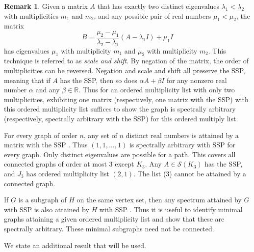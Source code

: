 \documentclass[11pt]{article}
\theoremstyle{definition}
\newtheorem{rem}[thm]{Remark}
\theoremstyle{definition}
\theoremstyle{definition}
\newcommand{\R}{\mathbb{R}}
\newcommand{\lam}{\lambda}
\newcommand{\mptn}{\mathcal{S}} %
\begin{document}

\begin{rem}\label{2evals}Given a matrix $A$ that has exactly two distinct eigenvalues $\lam_1<\lam_2$ with multiplicities $m_1$ and $m_2$, and any possible pair of  real numbers $\mu_1<\mu_2$, the matrix \[B=\frac{\mu_2-\mu_1}{\lam_2-\lam_1}(A-\lam_1I)+\mu_1I\] has eigenvalues $\mu_1$ with multiplicity $m_1$ and $\mu_2$ with multiplicity $m_2$.  This technique is referred to as {\em scale and shift}.  By negation of the matrix, the order of multiplicities can be reversed.  Negation and scale and shift all preserve the SSP, meaning that if $A$ has the SSP, then so does $\alpha A+\beta I$ for any nonzero real number $\alpha$ and any $\beta\in\R$.  Thus for an ordered multiplicity list with only two multiplicities, exhibiting one matrix (respectively, one matrix with the SSP) with this ordered multiplicity list suffices to show the graph is spectrally arbitrary (respectively, spectrally arbitrary with the SSP) for this ordered multiply list.
\end{rem}



For every graph of order $n$, any set of $n$ distinct real numbers is attained by a matrix with the SSP \cite[Remark~15]{genSAP}.  Thus  $(1,1,\dots,1)$ is spectrally arbitrary with SSP for every graph.  Only distinct eigenvalues are possible  for a path.  
This covers all connected graphs of order at most 3 except $K_3$.  Any $A\in\mptn(K_3)$ has the SSP, and  $J_3$ has ordered multiplicity list $(2,1)$. The list (3) cannot be attained by a  connected graph.

If $G$ is a subgraph of $H$ on the same vertex set, then any spectrum attained by $G$ with SSP  is also attained by $H$ with SSP \cite[Theorem~10]{genSAP}.  Thus it is useful to identify minimal graphs attaining a given ordered multiplicity list and show that these are spectrally arbitrary.  These minimal subgraphs need not be connected.


We state an additional result that will be used.
\end{document}
